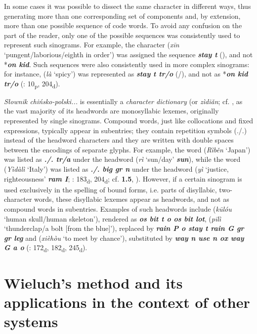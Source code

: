 \documentclass[output=paper,colorlinks,citecolor=brown,arabicfont,chinesefont]{langscibook}
\begin{document}
In some cases it was possible to dissect the same character in different ways, thus generating more than one corresponding set of components and, by extension, more than one possible sequence of code words. To avoid any confusion on the part of the reader, only one of the possible sequences was consistently used to represent such sinograms. For example, the character {} (\emph{xīn} ‘pungent/laborious/eighth in order’) was assigned the sequence \textbf{\emph{stay t}} ({}), and not *\textbf{\emph{on kid}}. Such sequences were also consistently used in more complex sinograms: for instance, {} (\emph{là} ‘spicy’) was represented as \textbf{\emph{stay t tr/o}} ({}/{}), and not as *\textbf{\emph{on kid tr/o}} (\citealt{Wieluch1936}: 10\textsubscript{p}, 204\textsubscript{d}).

\emph{Słownik chińsko-polski...} is essentially a \emph{character dictionary} (or {} \emph{zìdiǎn}; cf. \citet[545-551]{Huang_chu-ren2016}, as the vast majority of its headwords are monosyllabic lexemes, originally represented by single sinograms. Compound words, just like collocations and fixed expressions, typically appear in subentries; they contain repetition symbols (./.) instead of the headword characters and they are written with double spaces between the encodings of separate glyphs. For example, the word {} (\emph{Rìběn} ‘Japan’) was listed as \textbf{\emph{./.  tr/a}} under the headword {} (\emph{rì} ‘sun/day’ \textbf{\emph{sun}}), while the word {} (\emph{Yìdàlì} ‘Italy’) was listed as \textbf{\emph{./.  big  gr n}} under the headword {}  (\emph{yì} ‘justice, righteousness’ \textbf{\emph{ram I}}; \citealt{Wieluch1936}: 183\textsubscript{d}, 204\textsubscript{d}; cf. \textbf{1.5}, ). However, if a certain sinogram is used exclusively in the spelling of bound forms, i.e. parts of disyllabic, two-character words, these disyllabic lexemes appear as headwords, and not as compound words in subentries. Examples of such headwords include {} (\emph{kūlóu} ‘human skull/human skeleton’), rendered as \textbf{\emph{os bit t o  os bit lot}}, {} (\emph{pīlì} ‘thunderclap/a bolt [from the blue]’), replaced by \textbf{\emph{rain P o stay t  rain G gr gr leg}} and {} (\emph{xièhòu} ‘to meet by chance’), substituted by \textbf{\emph{way n use n ox  way G a o}} (\citealt{Wieluch1936}: 172\textsubscript{d}, 182\textsubscript{d}, 245\textsubscript{d}).

\section{Wieluch's method and its applications in the context of other systems}
\end{document}
